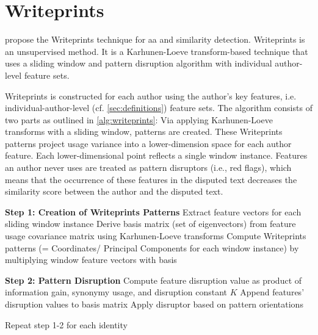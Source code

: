 \newcommand{\writeprints}{Writeprints}
\section{\writeprints{}}
\label{sec:writeprints}

\citet{abbasi_writeprints_2008} propose the \writeprints{} technique for \ac{aa} and similarity detection.
\writeprints{} is an unsupervised method. %
It is a Karhunen-Loeve transform-based technique that uses a sliding window and 
pattern disruption algorithm with individual author-level feature sets.

\writeprints{} is constructed for each author using the author's key features, 
i.e. individual-author-level (cf. \autoref{sec:definitions}) feature sets.
The algorithm consists of two parts as outlined in \autoref{alg:writeprints}:
Via applying Karhunen-Loeve transforms with a sliding window, patterns are created.
These \writeprints{} patterns project usage variance into a lower-dimension space for each author feature.
Each lower-dimensional point reflects a single window instance.
Features an author never uses are treated as pattern disruptors (i.e., red flags), 
which means that the occurrence of these features in the disputed text decreases the similarity score 
between the author and the disputed text.

\begin{algorithm}
\caption{Writeprints Steps}
\label{alg:writeprints}
\begin{algorithmic}[1]

        \State \textbf{Step 1: Creation of \writeprints{} Patterns}
            
            \State Extract feature vectors for each sliding window instance 
            \State Derive basis matrix (set of eigenvectors) from feature usage covariance matrix using Karhunen-Loeve transforms 
            \State Compute \writeprints{} patterns (= Coordinates/ Principal Components for each window instance) by multiplying window feature vectors with basis
        \EndFor
       

        \State \textbf{Step 2: Pattern Disruption}  
         
            \State Compute feature disruption value as product of information gain, synonymy usage, and disruption constant $K$
            \State Append features' disruption values to basis matrix
            \State Apply disruptor based on pattern orientations
          
        \EndFor

        \State Repeat step 1-2 for each identity
    \EndProcedure
\end{algorithmic}
\end{algorithm}



